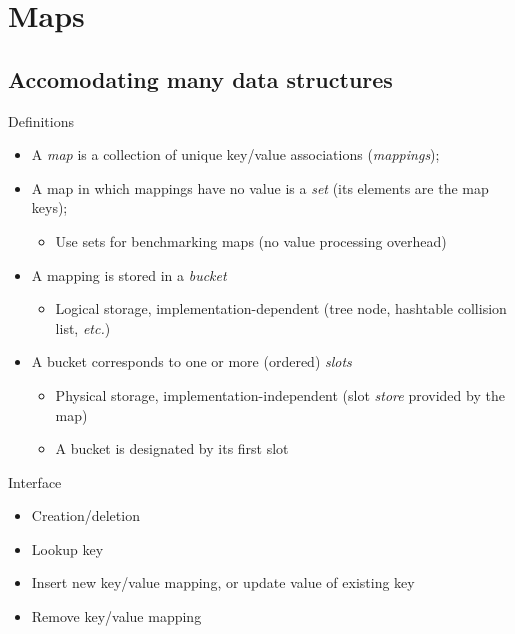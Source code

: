 \section{Maps}

\subsection{Accomodating many data structures}

\begin{frame}[fragile]{Definitions}

  \begin{itemize}
  \item A {\em map} is a collection of unique key/value associations ({\em mappings});
  \item A map in which mappings have no value is a {\em set} (its elements are the map keys);
    \begin{itemize}
    \item Use sets for benchmarking maps (no value processing overhead)
    \end{itemize}
  \item A mapping is stored in a {\em bucket}
    \begin{itemize}
    \item Logical storage, implementation-dependent (tree node, hashtable collision list, {\em etc.})
    \end{itemize}
  \item A bucket corresponds to one or more (ordered) {\em slots}
    \begin{itemize}
    \item Physical storage, implementation-independent (slot {\em store} provided by the map)
    \item A bucket is designated by its first slot
    \end{itemize}
  \end{itemize}

  Interface

  \begin{itemize}
  \item Creation/deletion
  \item Lookup key
  \item Insert new key/value mapping, or update value of existing key
  \item Remove key/value mapping
  \end{itemize}
  
\end{frame}


